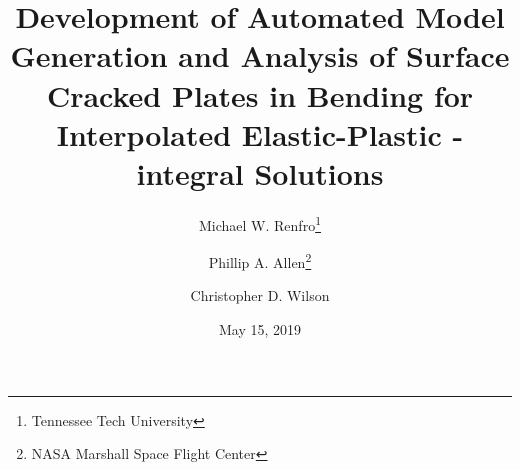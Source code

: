 \makeatletter
\def\beamer@framenotesbegin{%
  \gdef\beamer@noteitems{}%
  \gdef\beamer@notes{{}}%
}
\makeatother
{}

\usepackage{listings}
\lstset{basicstyle=\ttfamily\small}
\usepackage{graphicx} \graphicspath{{content/figures/}}
\usepackage{booktabs}
\usepackage{cool}
\usepackage{bm} %
\usepackage{siunitx}
\usepackage[backend=biber,natbib=true,style=authoryear,sorting=none,firstinits=true]{biblatex}





\author[Renfro, Allen, Wilson]{Michael W. Renfro\thanks{Tennessee Tech University} \and Phillip A. Allen\thanks{NASA Marshall Space Flight Center} \and Christopher D. Wilson\footnotemark[1]}

\title[Development of Automated Models for EP SC(B) Plates]{Development of Automated Model Generation and Analysis of Surface Cracked Plates in Bending for Interpolated Elastic-Plastic \J-integral Solutions}

\date{May 15, 2019}



\newcommand{\linktopage}[2]{\structure{\hyperlink{Navigation#1}{#2}}}



\begin{frame}[plain]
\maketitle
{}
\end{frame}

